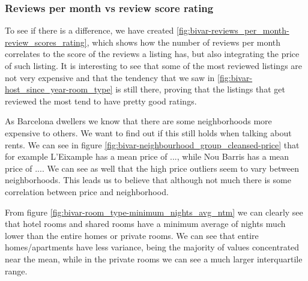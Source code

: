 \pagebreak
\subsubsection{Reviews per month vs review score rating}


 To see if there is a difference, we have created  \cref{fig:bivar-reviews_per_month-review_scores_rating}, which shows how the number of reviews per month correlates to the score of the reviews a listing has, but also integrating the price of such listing. It is interesting to see that some of the most reviewed listings are not very expensive and that the tendency that we saw in \cref{fig:bivar-host_since_year-room_type} is still there, proving that the listings that get reviewed the most tend to have pretty good ratings.

\pagebreak
{} 
\pagebreak

As Barcelona dwellers we know that there are some neighborhoods more expensive to others. We want to find out
if this still holds when talking about \airbnb rents.
We can see in figure \cref{fig:bivar-neighbourhood_group_cleansed-price} that for example L'Eixample has a mean price of ...,
while Nou Barris has a mean price of .... We can see as well
that the high price outliers seem to vary between neighborhoods. This leads us to believe that although not
much there is some correlation between price and neighborhood.

\pagebreak

From figure \cref{fig:bivar-room_type-minimum_nights_avg_ntm} we can clearly see that hotel rooms and
shared rooms have a minimum average of nights much lower than the entire homes or private rooms.
We can see that entire homes/apartments have less variance, being the majority of values concentrated
near the mean, while in the private rooms we can see a much larger interquartile range.

\pagebreak

\label{sub:bivariate_analysis}


